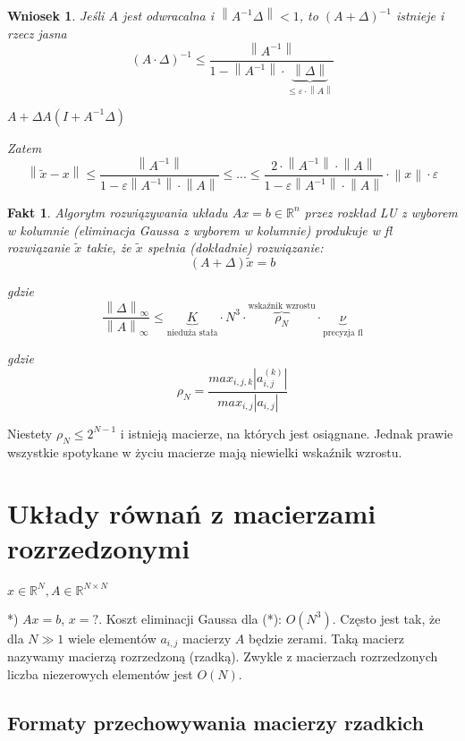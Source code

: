 \documentclass[hidelinks,a4paper,fleqn,oneside]{book}
\newcommand{\RR}{\mathbb{R}}
\newcommand{\norm}[1]{\left\lVert#1\right\rVert}
\newtheorem{wniosek}{Wniosek}
\newtheorem{fakt}{Fakt}
\begin{document}
\begin{wniosek} Jeśli $A$ jest odwracalna i $\norm{A ^ {-1} \Delta} < 1$, to $(A + \Delta)^{-1}$ istnieje i rzecz jasna
	\[
		(A \cdot \Delta)^{-1} \leq \frac{\norm{A^{-1}}}{1 - \norm{A^{-1}} \cdot \underbrace{\norm{\Delta}}_{\leq \varepsilon \cdot \norm{A}}}
	\]
	
	$A + \Delta  A(I + A^{-1} \Delta)$
	
	Zatem
	\[
		\norm{\tilde{x} - x} \leq \frac{\norm{A^{-1}}}{1 - \varepsilon \norm{A^{-1}} \cdot \norm{A}} \leq ... \leq \frac{2 \cdot \norm{A^{-1}} \cdot \norm{A}}{1 - \varepsilon \norm{A^{-1}} \cdot \norm{A}} \cdot \norm{x} \cdot \varepsilon
	\]
\end{wniosek}

\begin{fakt} Algorytm rozwiązywania układu $Ax = b \in \RR^n$ przez rozkład LU z wyborem w kolumnie (eliminacja Gaussa z wyborem w kolumnie) produkuje w fl rozwiązanie $\tilde{x}$ takie, że $\tilde{x}$ spełnia (dokładnie) rozwiązanie:
	\[
		(A + \Delta)\tilde{x} = b
	\]
	
	gdzie
	\[
		\frac{\norm{\Delta}_\infty}{\norm{A}_\infty} \leq \underbrace{K}_{\textrm{nieduża stała}} \cdot N^3 \cdot \overbrace{\rho_N}^{\textrm{wskaźnik wzrostu}} \cdot \underbrace{\nu}_{\textrm{precyzja fl}}
	\]
	
	gdzie
	\[
		\rho_N = \frac{max_{i, j, k} |a_{i, j}^{(k)}|}{max_{i, j}|a_{i,j}|}
	\]
\end{fakt}

Niestety $\rho_N \leq 2^{N-1}$ i istnieją macierze, na których jest osiągnane. Jednak prawie wszystkie spotykane w życiu macierze mają niewielki wskaźnik wzrostu.

\section{Układy równań z macierzami rozrzedzonymi}

$x \in \RR^N, A \in \RR^{N \times N}$

*) $Ax = b$, $x = ?$. Koszt eliminacji Gaussa dla (*): $O(N^3)$. Często jest tak, że dla $N \gg 1$ wiele elementów $a_{i,j}$ macierzy $A$ będzie zerami. Taką macierz nazywamy macierzą rozrzedzoną (rzadką). Zwykle z macierzach rozrzedzonych liczba niezerowych elementów jest $O(N)$.

\subsection{Formaty przechowywania macierzy rzadkich}
\end{document}
